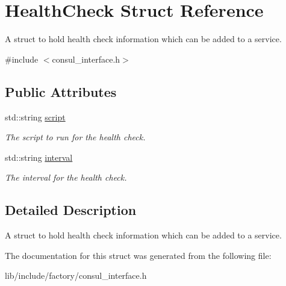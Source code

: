 \hypertarget{structHealthCheck}{\section{Health\-Check Struct Reference}
\label{structHealthCheck}
}


A struct to hold health check information which can be added to a service.  




{\ttfamily \#include $<$consul\-\_\-interface.\-h$>$}

\subsection*{Public Attributes}
\begin{DoxyCompactItemize}
\item 
\hypertarget{structHealthCheck_af2cf9613abcc567941f8a21cd8c15bff}{std\-::string \hyperlink{structHealthCheck_af2cf9613abcc567941f8a21cd8c15bff}{script}}\label{structHealthCheck_af2cf9613abcc567941f8a21cd8c15bff}

\begin{DoxyCompactList}\small\item\em The script to run for the health check. \end{DoxyCompactList}\item 
\hypertarget{structHealthCheck_af8e93405495e1733ba69a7e3f73a139a}{std\-::string \hyperlink{structHealthCheck_af8e93405495e1733ba69a7e3f73a139a}{interval}}\label{structHealthCheck_af8e93405495e1733ba69a7e3f73a139a}

\begin{DoxyCompactList}\small\item\em The interval for the health check. \end{DoxyCompactList}\end{DoxyCompactItemize}


\subsection{Detailed Description}
A struct to hold health check information which can be added to a service. 

The documentation for this struct was generated from the following file\-:\begin{DoxyCompactItemize}
\item 
lib/include/factory/consul\-\_\-interface.\-h\end{DoxyCompactItemize}
